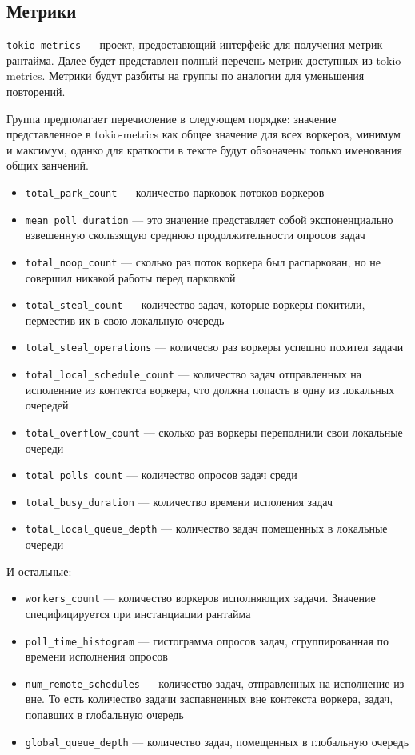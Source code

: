 \subsection{Метрики}

\verb|tokio-metrics| --- проект, предоставющий интерфейс для получения метрик рантайма. Далее будет представлен полный перечень метрик доступных из tokio-metrics. Метрики будут разбиты на группы по аналогии для уменьшения повторений.

Группа предполагает перечисление в следующем порядке: значение представленное в tokio-metrics как общее значение для всех воркеров, минимум и максимум, оданко для краткости в тексте будут обзоначены только именования общих занчений.

\begin{itemize}
    \item \verb|total_park_count| --- количество парковок потоков воркеров
    \item \verb|mean_poll_duration| --- это значение представляет собой экспоненциально взвешенную скользящую среднюю продолжительности опросов задач
    \item \verb|total_noop_count| --- сколько раз поток воркера был распаркован, но не совершил никакой работы перед парковкой
    \item \verb|total_steal_count| --- количество задач, которые воркеры похитили, перместив их в свою локальную очередь
    \item \verb|total_steal_operations| --- количесво раз воркеры успешно похител задачи
    \item \verb|total_local_schedule_count| --- количество задач отправленных на исполенние из контектса воркера, что должна попасть в одну из локальных очередей
    \item \verb|total_overflow_count| --- сколько раз воркеры переполнили свои локальные очереди
    \item \verb|total_polls_count| --- количество опросов задач среди
    \item \verb|total_busy_duration| --- количество времени исполения задач
    \item \verb|total_local_queue_depth| --- количество задач помещенных в локальные очереди
\end{itemize}

И остальные:

\begin{itemize}
    \item \verb|workers_count| --- количество воркеров исполняющих задачи. Значение специфицируется при инстанциации рантайма

    \item \verb|poll_time_histogram| --- гистограмма опросов задач, сгруппированная по времени исполнения опросов

    \item \verb|num_remote_schedules| --- количество задач, отправленных на исполнение из вне. То есть количество задачи заспавненных вне контекста воркера, задач, попавших в глобальную очередь

    \item \verb|global_queue_depth| --- количество задач, помещенных в глобальную очередь
\end{itemize}

